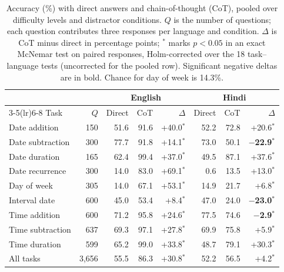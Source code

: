 \begin{table}[t]
\centering
\begin{tabular}{lrrrrrrr}
\toprule
 & & \multicolumn{3}{c}{English} & \multicolumn{3}{c}{Hindi} \\
\cmidrule(lr){3-5}\cmidrule(lr){6-8}
Task & $Q$ & Direct & CoT & $\Delta$ & Direct & CoT & $\Delta$ \\
\midrule
Date addition & 150 & 51.6 & 91.6 & +40.0$^{*}$ & 52.2 & 72.8 & +20.6$^{*}$ \\
Date subtraction & 300 & 77.7 & 91.8 & +14.1$^{*}$ & 73.0 & 50.1 & \textbf{$-$22.9$^{*}$} \\
Date duration & 165 & 62.4 & 99.4 & +37.0$^{*}$ & 49.5 & 87.1 & +37.6$^{*}$ \\
Date recurrence & 300 & 14.0 & 83.0 & +69.1$^{*}$ & 0.6 & 13.5 & +13.0$^{*}$ \\
Day of week & 305 & 14.0 & 67.1 & +53.1$^{*}$ & 14.9 & 21.7 & +6.8$^{*}$ \\
Interval date & 600 & 45.0 & 53.4 & +8.4$^{*}$ & 47.0 & 24.0 & \textbf{$-$23.0$^{*}$} \\
Time addition & 600 & 71.2 & 95.8 & +24.6$^{*}$ & 77.5 & 74.6 & \textbf{$-$2.9$^{*}$} \\
Time subtraction & 637 & 69.3 & 97.1 & +27.8$^{*}$ & 69.9 & 75.8 & +5.9$^{*}$ \\
Time duration & 599 & 65.2 & 99.0 & +33.8$^{*}$ & 48.7 & 79.1 & +30.3$^{*}$ \\
\midrule
All tasks & 3,656 & 55.5 & 86.3 & +30.8$^{*}$ & 52.2 & 56.5 & +4.2$^{*}$ \\
\bottomrule
\end{tabular}
\caption{Accuracy (\%) with direct answers and chain-of-thought (CoT), pooled over difficulty levels and distractor conditions. $Q$ is the number of questions; each question contributes three responses per language and condition. $\Delta$ is CoT minus direct in percentage points; $^{*}$ marks $p<0.05$ in an exact McNemar test on paired responses, Holm-corrected over the 18 task--language tests (uncorrected for the pooled row). Significant negative deltas are in bold. Chance for day of week is 14.3\%.}
\label{tab:cot-delta}
\end{table}
